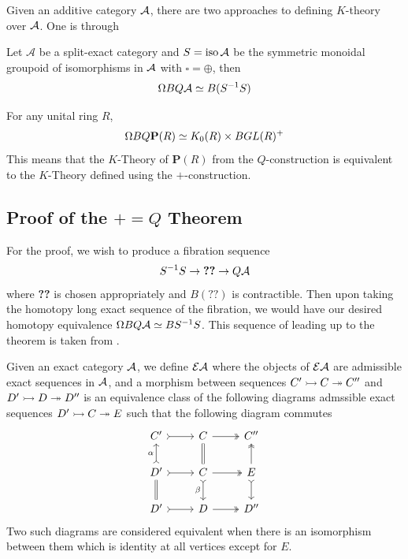 Given an additive category $\mathcal{A}$, there are two approaches to defining $K$-theory over $\mathcal{A}$.
One is through

\begin{theorem}[Quillen]\label{thm:Quillen}
Let $\mathcal A$ be a split-exact category
and $S = \operatorname*{iso} \mathcal A$ be the symmetric monoidal groupoid of isomorphisms in $\mathcal{A}$ with $\square = \oplus$,
then \[\Omega BQ \mathcal A \simeq B(S^{-1}S) \]
\end{theorem}

\begin{corollary}[$+=Q$]\label{thm:+=Q}
For any unital ring $R$,
\[\Omega B Q \mathbf P (R) \simeq K_0(R) \times BGL(R)^+\]
This means that the $K$-Theory of $\mathbf P(R)$ from the $Q$-construction is equivalent to the
$K$-Theory defined using the $+$-construction.
\end{corollary}

\subsection{Proof of the $+=Q$ Theorem}

For the proof,
we wish to produce a fibration sequence
\[
S^{-1}S \to \textbf{??} \to Q\mathcal{A}
\]
where \textbf{??} is chosen appropriately
and $B(\textbf{??})$ is contractible.
Then upon taking the homotopy long exact sequence of the fibration,
we would have our desired homotopy equivalence $\Omega BQ\mathcal{A} \simeq BS^{-1}S$.
This sequence of leading up to the theorem is taken from \cite{WeibelKbook}.

\begin{definition}%
Given an exact category $\mathcal{A}$, we define $\mathcal{E}\mathcal{A}$ where
the objects of $\mathcal{E}\mathcal{A}$ are admissible exact sequences in $\mathcal{A}$,
and a morphism between sequences $C' \rightarrowtail C \twoheadrightarrow C''$ and $D' \rightarrowtail D \twoheadrightarrow D''$
is an equivalence class of the following diagrams admssible exact sequences $D' \rightarrowtail C \twoheadrightarrow E$
such that the following diagram commutes
\[
\begin{tikzcd}
C' \arrow[r,tail] & C \arrow[r,two heads] \arrow[d,equal] & C''\\
D' \arrow[r,tail] \arrow[u,tail, "\alpha"]  \arrow[d,equal] & C \arrow[d,tail, "\beta"'] \arrow[r,two heads] & E\arrow[d,tail] \arrow[u,two heads] \\
D' \arrow[r,tail] & D \arrow[r,two heads] & D''
\end{tikzcd}
\]
Two such diagrams are considered equivalent when there is an isomorphism between them which is
identity at all vertices except for $E$.
\end{definition}

